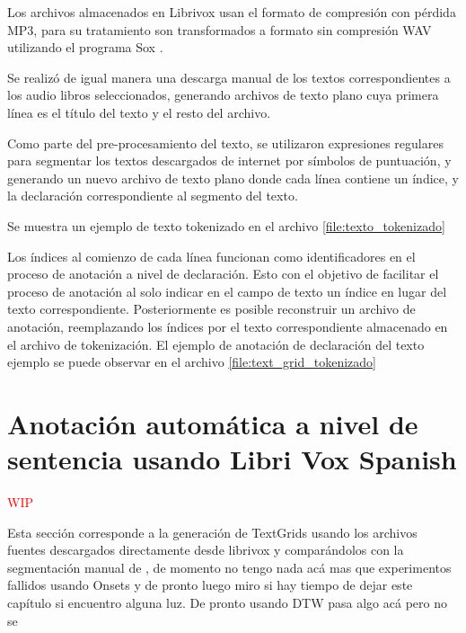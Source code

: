 \documentclass[a4paper,12pt,twoside]{report}
\begin{document}
Los archivos almacenados en Librivox usan el formato de compresión con pérdida MP3, para su tratamiento son transformados a formato sin compresión WAV utilizando el programa Sox \cite{Sox}.

Se realizó de igual manera una descarga manual de los textos correspondientes a los audio libros seleccionados, generando archivos de texto plano cuya primera línea es el título del texto y el resto del archivo.

Como parte del pre-procesamiento del texto, se utilizaron expresiones regulares para segmentar los textos descargados de internet por símbolos de puntuación, y generando un nuevo archivo de texto plano donde cada línea contiene un índice, y la declaración correspondiente al segmento del texto.

Se muestra un ejemplo de texto tokenizado en el archivo \ref{file:texto_tokenizado}



Los índices al comienzo de cada línea funcionan como identificadores en el proceso de anotación a nivel de declaración. Esto con el objetivo de facilitar el proceso de anotación al solo indicar en el campo de texto un índice en lugar del texto correspondiente. Posteriormente es posible reconstruir un archivo de anotación, reemplazando los índices por el texto correspondiente almacenado en el archivo de tokenización. El ejemplo de anotación de declaración del texto ejemplo se puede observar en el archivo \ref{file:text_grid_tokenizado}




\section{Anotación automática a nivel de sentencia usando Libri Vox Spanish}

\textcolor{red}{WIP}

Esta sección corresponde a la generación de TextGrids usando los archivos fuentes descargados directamente desde librivox y comparándolos con la segmentación manual de \cite{LibriVox-Spanish}, de momento no tengo nada acá mas que experimentos fallidos usando Onsets y de pronto luego miro si hay tiempo de dejar este capítulo si encuentro alguna luz. De pronto usando DTW pasa algo acá pero no se
\end{document}
